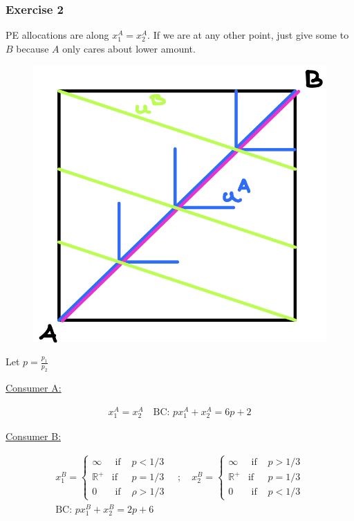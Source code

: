 {
\subsubsection*{Exercise 2}

\begin{enumerate}[label=(\alph*)]
{\item 
PE allocations are along $x_{1}^{A}=x_{2}^{A}$. If we are at any other point, just give some to $B$ because $A$ only cares about lower amount.

\begin{figure}[!h]
    \centering
    \includegraphics[width=0.75\linewidth]{images/2014_15_2.png}    
\end{figure}
}
{\item 
Let $p=\frac{p_{1}}{p_{2}}$

\underline{Consumer A:}

\begin{align*}
    x_{1}^{A}=x_{2}^{A} \quad\text{BC: } p x_{1}^{A}+x_{2}^{A}=6 p+2
\end{align*}

\underline{Consumer B:}

\begin{align*}
    x_1^B=\left\{\begin{array}{lll}
        \infty & \text { if } & p<1 / 3 \\
        \mathbb{R}^{+} & \text {if } & p=1 / 3 \\
        0 & \text { if } & \rho>1 / 3
    \end{array}\right. 
    \quad ; \quad
    x_2^B=\left\{\begin{array}{lll}
        \infty & \text { if } & p>1 / 3 \\
        \mathbb{R}^{+} & \text {if } & p=1 / 3 \\
        0 & \text { if } & p<1 / 3
    \end{array}\right. \\
    \text{BC: } p x_1^B+x_2^B=2 p+6
\end{align*}

}
\end{enumerate}}
